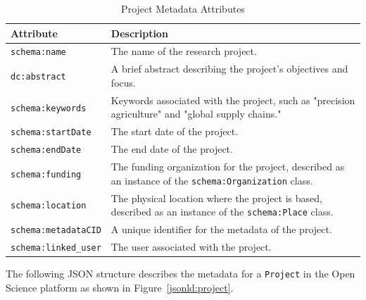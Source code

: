 \documentclass{article}
\begin{document}
\begin{table}[h]
      \centering
      \label{tab:project_metadata}
      \renewcommand{\arraystretch}{1.2}
      \begin{tabularx}{\textwidth}{|l|X|}
            \hline
            \textbf{Attribute}           & \textbf{Description}                                                                                           \\ \hline
            \texttt{schema:name}         & The name of the research project.                                                                              \\ \hline
            \texttt{dc:abstract}         & A brief abstract describing the project's objectives and focus.                                                \\ \hline
            \texttt{schema:keywords}     & Keywords associated with the project, such as "precision agriculture" and "global supply chains."              \\ \hline
            \texttt{schema:startDate}    & The start date of the project.                                                                                 \\ \hline
            \texttt{schema:endDate}      & The end date of the project.                                                                                   \\ \hline
            \texttt{schema:funding}      & The funding organization for the project, described as an instance of the \texttt{schema:Organization} class.  \\ \hline
            \texttt{schema:location}     & The physical location where the project is based, described as an instance of the \texttt{schema:Place} class. \\ \hline
            \texttt{schema:metadataCID}  & A unique identifier for the metadata of the project.                                                           \\ \hline
            \texttt{schema:linked\_user} & The user associated with the project.                                                                          \\ \hline
      \end{tabularx}
      \caption{Project Metadata Attributes}
\end{table}

The following JSON structure describes the metadata for a \texttt{Project} in the Open Science platform as shown in Figure~\ref{jsonld:project}.
\end{document}

